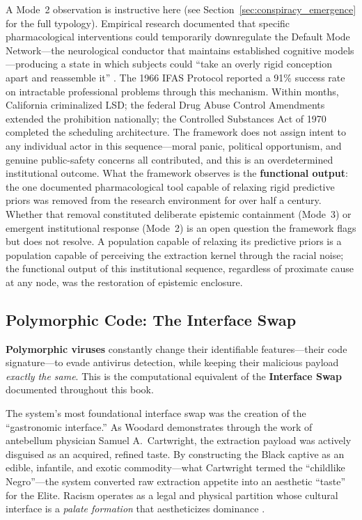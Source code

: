 A Mode~2 observation is instructive here (see Section~\ref{sec:conspiracy_emergence} for the full typology). Empirical research documented that specific pharmacological interventions could temporarily downregulate the Default Mode Network---the neurological conductor that maintains established cognitive models---producing a state in which subjects could ``take an overly rigid conception apart and reassemble it'' \cite{ifas_1966}. The 1966 IFAS Protocol reported a 91\% success rate on intractable professional problems through this mechanism. Within months, California criminalized LSD; the federal Drug Abuse Control Amendments extended the prohibition nationally; the Controlled Substances Act of 1970 completed the scheduling architecture. The framework does not assign intent to any individual actor in this sequence---moral panic, political opportunism, and genuine public-safety concerns all contributed, and this is an overdetermined institutional outcome. What the framework observes is the \textbf{functional output}: the one documented pharmacological tool capable of relaxing rigid predictive priors was removed from the research environment for over half a century. Whether that removal constituted deliberate epistemic containment (Mode~3) or emergent institutional response (Mode~2) is an open question the framework flags but does not resolve. A population capable of relaxing its predictive priors is a population capable of perceiving the extraction kernel through the racial noise; the functional output of this institutional sequence, regardless of proximate cause at any node, was the restoration of epistemic enclosure.

\subsection{Polymorphic Code: The Interface Swap}

\textbf{Polymorphic viruses} constantly change their identifiable features---their code signature---to evade antivirus detection, while keeping their malicious payload \textit{exactly the same}. This is the computational equivalent of the \textbf{Interface Swap} documented throughout this book.

The system's most foundational interface swap was the creation of the ``gastronomic interface.'' As Woodard demonstrates through the work of antebellum physician Samuel A.~Cartwright, the extraction payload was actively disguised as an acquired, refined taste. By constructing the Black captive as an edible, infantile, and exotic commodity---what Cartwright termed the ``childlike Negro''---the system converted raw extraction appetite into an aesthetic ``taste'' for the Elite. Racism operates as a legal and physical partition whose cultural interface is a \textit{palate formation} that aestheticizes dominance \cite{cartwright_report, woodard_delectable}.

